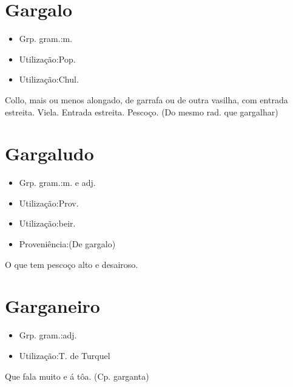 \section{Gargalo}
\begin{itemize}
\item {Grp. gram.:m.}
\end{itemize}
\begin{itemize}
\item {Utilização:Pop.}
\end{itemize}
\begin{itemize}
\item {Utilização:Chul.}
\end{itemize}
Collo, mais ou menos alongado, de garrafa ou de outra vasilha, com entrada estreita.
Viela.
Entrada estreita.
Pescoço.
(Do mesmo rad. que \textunderscore gargalhar\textunderscore )
\section{Gargaludo}
\begin{itemize}
\item {Grp. gram.:m.  e  adj.}
\end{itemize}
\begin{itemize}
\item {Utilização:Prov.}
\end{itemize}
\begin{itemize}
\item {Utilização:beir.}
\end{itemize}
\begin{itemize}
\item {Proveniência:(De \textunderscore gargalo\textunderscore )}
\end{itemize}
O que tem pescoço alto e desairoso.
\section{Garganeiro}
\begin{itemize}
\item {Grp. gram.:adj.}
\end{itemize}
\begin{itemize}
\item {Utilização:T. de Turquel}
\end{itemize}
Que fala muito e á tôa.
(Cp. \textunderscore garganta\textunderscore )
